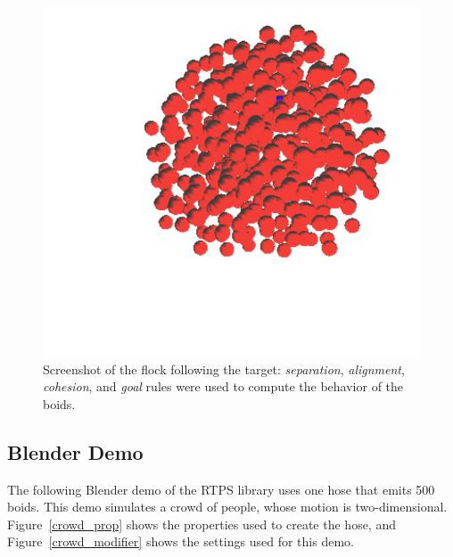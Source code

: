 \begin{figure}[htbp]
\begin{center}
\includegraphics[scale=0.35]{figures/demo_goal_4rules.pdf}
\caption{Screenshot of the flock following the target: \textit{separation}, \textit{alignment}, \textit{cohesion}, and \textit{goal} rules were used to compute the behavior of the boids.}
\label{goal_4rules}
\end{center}
\end{figure}

\subsection{Blender Demo}

The following Blender demo of the RTPS library uses one hose that emits 500 boids. This demo simulates a crowd of people, whose motion is two-dimensional. Figure~\ref{crowd_prop} shows the properties used to create the hose, and Figure~\ref{crowd_modifier} shows the settings used for this demo. 

